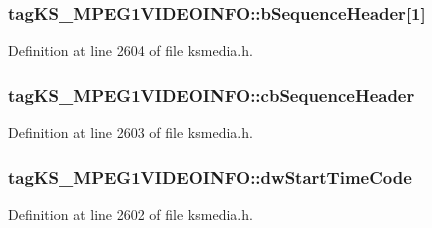 \subsubsection[{\texorpdfstring{b\+Sequence\+Header}{bSequenceHeader}}]{ tag\+K\+S\+\_\+\+M\+P\+E\+G1\+V\+I\+D\+E\+O\+I\+N\+F\+O\+::b\+Sequence\+Header\mbox{[}1\mbox{]}}\hypertarget{structtag_k_s___m_p_e_g1_v_i_d_e_o_i_n_f_o_ae858547ee2c36affb23df65567845ddd}{}\label{structtag_k_s___m_p_e_g1_v_i_d_e_o_i_n_f_o_ae858547ee2c36affb23df65567845ddd}


Definition at line 2604 of file ksmedia.\+h.

\subsubsection[{\texorpdfstring{cb\+Sequence\+Header}{cbSequenceHeader}}]{ tag\+K\+S\+\_\+\+M\+P\+E\+G1\+V\+I\+D\+E\+O\+I\+N\+F\+O\+::cb\+Sequence\+Header}\hypertarget{structtag_k_s___m_p_e_g1_v_i_d_e_o_i_n_f_o_acc9b4707eff47ec95310af139b2c7cc6}{}\label{structtag_k_s___m_p_e_g1_v_i_d_e_o_i_n_f_o_acc9b4707eff47ec95310af139b2c7cc6}


Definition at line 2603 of file ksmedia.\+h.

\subsubsection[{\texorpdfstring{dw\+Start\+Time\+Code}{dwStartTimeCode}}]{ tag\+K\+S\+\_\+\+M\+P\+E\+G1\+V\+I\+D\+E\+O\+I\+N\+F\+O\+::dw\+Start\+Time\+Code}\hypertarget{structtag_k_s___m_p_e_g1_v_i_d_e_o_i_n_f_o_aa7c29af6637207cd8da2f9d4bfc74b9e}{}\label{structtag_k_s___m_p_e_g1_v_i_d_e_o_i_n_f_o_aa7c29af6637207cd8da2f9d4bfc74b9e}


Definition at line 2602 of file ksmedia.\+h.

